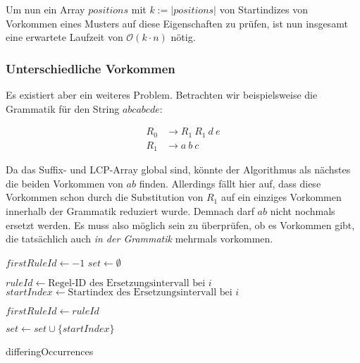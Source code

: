 Um nun ein Array $positions$ mit $k := |positions|$ von Startindizes von Vorkommen eines Musters auf diese Eigenschaften zu prüfen, ist nun insgesamt eine erwartete Laufzeit von $\mathcal{O}(k \cdot n)$ nötig.

\subsubsection{Unterschiedliche Vorkommen}

Es existiert aber ein weiteres Problem. Betrachten wir beispielsweise die Grammatik für den String $abcabcde$:

\begin{align*}
	R_0 &\rightarrow R_1\ R_1\ d\ e\\
	R_1 &\rightarrow a\ b\ c
\end{align*}

Da das Suffix- und LCP-Array global sind, könnte der Algorithmus als nächstes die beiden Vorkommen von $ab$ finden. 
Allerdings fällt hier auf, dass diese Vorkommen schon durch die Substitution von $R_1$ auf ein einziges Vorkommen innerhalb der Grammatik reduziert wurde. Demnach darf $ab$ nicht nochmals ersetzt werden. 
Es muss also möglich sein zu überprüfen, ob es Vorkommen gibt, die tatsächlich auch \emph{in der Grammatik} mehrmals vorkommen.
\begin{algorithm}[t]
    $firstRuleId \leftarrow -1$\;
    $set \leftarrow \emptyset$\;
     {
        $ruleId \leftarrow \text{Regel-ID des Ersetzungsintervall bei } i$\;
        $startIndex \leftarrow \text{Startindex des Ersetzungsintervall bei } i$\;
        
         {
            $firstRuleId \leftarrow ruleId$\;
        }
         {
            \;
        }
            
        $set \leftarrow set \cup \{startIndex\}$\;
    }
    \;
    \caption{differingOccurrences}
    \label{diffOccAlgoV2}
\end{algorithm}

